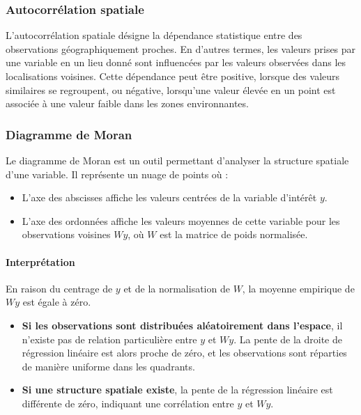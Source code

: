 \documentclass[
]{article}
\providecommand{\tightlist}{%
  \setlength{\itemsep}{0pt}\setlength{\parskip}{0pt}}
\begin{document}
\hypertarget{autocorruxe9lation-spatiale}{%
\subsubsection{Autocorrélation
spatiale}\label{autocorruxe9lation-spatiale}}

L'autocorrélation spatiale désigne la dépendance statistique entre des
observations géographiquement proches. En d'autres termes, les valeurs
prises par une variable en un lieu donné sont influencées par les
valeurs observées dans les localisations voisines. Cette dépendance peut
être positive, lorsque des valeurs similaires se regroupent, ou
négative, lorsqu'une valeur élevée en un point est associée à une valeur
faible dans les zones environnantes.

\hypertarget{diagramme-de-moran}{%
\subsubsection{Diagramme de Moran}\label{diagramme-de-moran}}

Le diagramme de Moran est un outil permettant d'analyser la structure
spatiale d'une variable. Il représente un nuage de points où :

\begin{itemize}
\tightlist
\item
  L'axe des abscisses affiche les valeurs centrées de la variable
  d'intérêt \(y\).\\
\item
  L'axe des ordonnées affiche les valeurs moyennes de cette variable
  pour les observations voisines \(W y\), où \(W\) est la matrice de
  poids normalisée.
\end{itemize}

\hypertarget{interpruxe9tation}{%
\paragraph{Interprétation}\label{interpruxe9tation}}

En raison du centrage de \(y\) et de la normalisation de \(W\), la
moyenne empirique de \(W y\) est égale à zéro.

\begin{itemize}
\tightlist
\item
  \textbf{Si les observations sont distribuées aléatoirement dans
  l'espace}, il n'existe pas de relation particulière entre \(y\) et
  \(W y\). La pente de la droite de régression linéaire est alors proche
  de zéro, et les observations sont réparties de manière uniforme dans
  les quadrants.\\
\item
  \textbf{Si une structure spatiale existe}, la pente de la régression
  linéaire est différente de zéro, indiquant une corrélation entre \(y\)
  et \(W y\).
\end{itemize}
\end{document}
